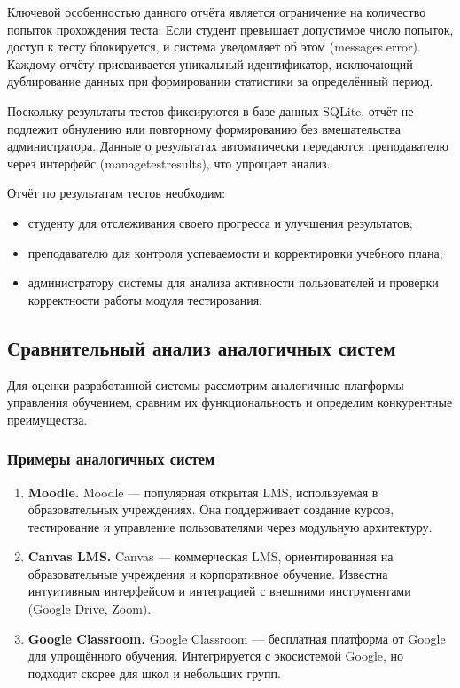Ключевой особенностью данного отчёта является ограничение на количество попыток прохождения теста. Если студент превышает допустимое число попыток, доступ к тесту блокируется, и система уведомляет об этом (messages.error). Каждому отчёту присваивается уникальный идентификатор, исключающий дублирование данных при формировании статистики за определённый период.

Поскольку результаты тестов фиксируются в базе данных SQLite, отчёт не подлежит обнулению или повторному формированию без вмешательства администратора. Данные о результатах автоматически передаются преподавателю через интерфейс (managetestresults), что упрощает анализ. 

Отчёт по результатам тестов необходим: 

\begin{itemize}
	\item студенту для отслеживания своего прогресса и улучшения результатов; 
	\item преподавателю для контроля успеваемости и корректировки учебного плана; 
	\item администратору системы для анализа активности пользователей и проверки корректности работы модуля тестирования.
\end{itemize}

\subsection{Сравнительный анализ аналогичных систем}

Для оценки разработанной системы рассмотрим аналогичные платформы управления обучением, сравним их функциональность и определим конкурентные преимущества.

\subsubsection{Примеры аналогичных систем}

\begin{enumerate}
	\item \textbf{Moodle.} Moodle --- популярная открытая LMS, используемая в образовательных учреждениях. Она поддерживает создание курсов, тестирование и управление пользователями через модульную архитектуру.
	\item \textbf{Canvas LMS.} Canvas --- коммерческая LMS, ориентированная на образовательные учреждения и корпоративное обучение. Известна интуитивным интерфейсом и интеграцией с внешними инструментами (Google Drive, Zoom).
	\item \textbf{Google Classroom.} Google Classroom --- бесплатная платформа от Google для упрощённого обучения. Интегрируется с экосистемой Google, но подходит скорее для школ и небольших групп.
\end{enumerate}


